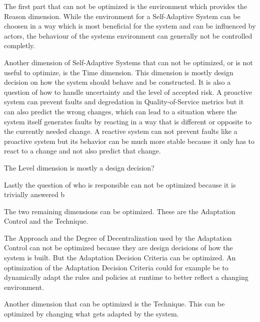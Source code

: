 The first part that can not be optimized is the environment which provides the Reason dimension.
While the environment for a Self-Adaptive System can be choosen in a way which is most beneficial for the system
and can be influenced by actors, %
the behaviour of the systems environment can generally not be controlled completly.

Another dimension of Self-Adaptive Systems that can not be optimized, or is not useful to optimize,
is the Time dimension. This dimension is mostly design decision on how the system should behave and be constructed.
It is also a question of how to handle uncertainty and the level of accepted risk.
A proactive system can prevent faults and degredation in Quality-of-Service metrics 
but it can also predict the wrong changes, which can lead to a situation where the system itself generates faults by
reacting in a way that is different or opposite to the currently needed change. %
A reactive system can not prevent faults like a proactive system
but its behavior can be much more stable because it only has to react to a change and not also predict that change.

The Level dimension is mostly a design decision?

Lastly the question of who is responsible can not be optimized because it is trivially answered b


The two remaining dimensions can be optimized. These are the Adaptation Control and the Technique.

The Approach and the Degree of Decentralization used by the Adaptation Control can not be optimized 
because they are design decisions of how the system is built.
But the Adaptation Decision Criteria can be optimized. An optimization of the Adaptation Decision Criteria
could for example be to dynamically adapt the rules and policies at runtime to better reflect a changing environment.

Another dimension that can be optimized is the Technique. 
This can be optimized by changing what gets adapted by the system.


